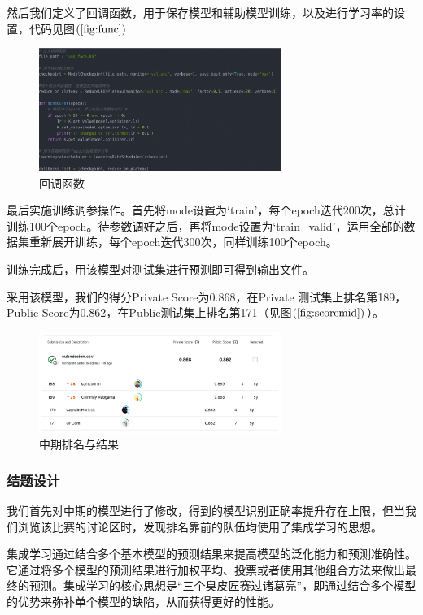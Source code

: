\documentclass[UTF8]{ctexart}
\begin{document}
然后我们定义了回调函数，用于保存模型和辅助模型训练，以及进行学习率的设置，代码见图$\left(\ref{fig:func}\right)$
\begin{figure}[!ht]
  \centering
  \includegraphics[width=0.7\textwidth]{func.jpg}
  \caption{回调函数}
  \label{fig:func}
\end{figure}

最后实施训练调参操作。首先将mode设置为‘train’，每个epoch迭代200次，总计训练100个epoch。待参数调好之后，再将mode设置为‘train\_valid’，运用全部的数据集重新展开训练，每个epoch迭代300次，同样训练100个epoch。

训练完成后，用该模型对测试集进行预测即可得到输出文件。

采用该模型，我们的得分Private Score为0.868，在Private 测试集上排名第189，Public Score为0.862，在Public测试集上排名第171（见图$\left(\ref{fig:scoremid}\right)$）。
\begin{figure}[!ht]
    \centering
    \includegraphics[width=0.7\textwidth]{scoremid.png}
    \caption{中期排名与结果}
    \label{fig:scoremid}
\end{figure}

\subsubsection{结题设计}
我们首先对中期的模型进行了修改，得到的模型识别正确率提升存在上限，但当我们浏览该比赛的讨论区时，发现排名靠前的队伍均使用了集成学习的思想。

集成学习通过结合多个基本模型的预测结果来提高模型的泛化能力和预测准确性。它通过将多个模型的预测结果进行加权平均、投票或者使用其他组合方法来做出最终的预测。集成学习的核心思想是“三个臭皮匠赛过诸葛亮”，即通过结合多个模型的优势来弥补单个模型的缺陷，从而获得更好的性能。
\end{document}
